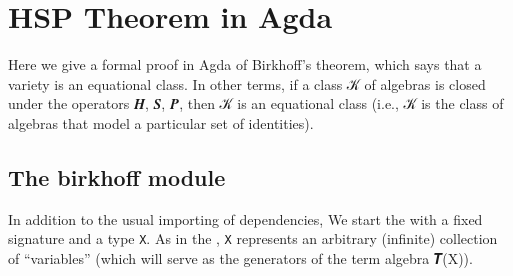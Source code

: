 \documentclass[a4paper,UKenglish,cleveref, autoref, thm-restate]{lipics-v2019}
\begin{document}
\begin{comment}
\subsubsection{Identities for HSP closure}\label{identities-for-hsp-closure}
\begin{code}\end{code}


\subsection{Axiomatization of a class}\label{axiomatization-of-a-class}
We conclude the \closuremodule by proving that a class 𝒦 of structures is axiomatized by \texttt{Th\ (VClo\ 𝒦)}, which is the set of equations satisfied by all members of the varietal closure of 𝒦.
\begin{code}\end{code}

\end{comment}


\section{HSP Theorem in Agda}\label{hsp-theorem-in-agda}
Here we give a formal proof in Agda of Birkhoff's theorem, which says that a variety is an equational class. In other terms, if a class 𝒦 of algebras is closed under the operators 𝑯, 𝑺, 𝑷, then 𝒦 is an equational class (i.e., 𝒦 is the class of algebras that model a particular set of identities).

\subsection{The birkhoff module}\label{the-birkhoff-module}
In addition to the usual importing of dependencies, We start the \birkhoffmodule with a fixed signature and a type \texttt{X}. As in the \termsmodule, \texttt{X} represents an arbitrary (infinite) collection of ``variables'' (which will serve as the generators of the term algebra 𝑻(X)).
\begin{code}\end{code}
\end{document}
